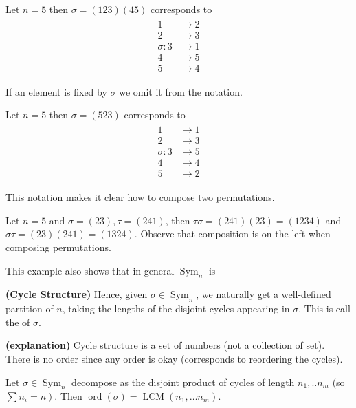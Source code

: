 \documentclass{article}
\newcommand{\bfs}[1]{\textbf{({#1}) }}
\newcommand{\ord}{\operatorname{ord}}
\newcommand{\Sym}{\operatorname{Sym}}
\newcommand{\LCM}{\operatorname{LCM}}
\begin{document}
\begin{exma}
Let $n=5$ then $\sigma=(123)(45)$ corresponds to
\begin{align*}
\begin{aligned}
1 & \longrightarrow 2 \\
2 & \longrightarrow 3 \\
\sigma: 3 & \longrightarrow 1 \\
4 & \longrightarrow 5 \\
5 & \longrightarrow 4
\end{aligned}
\end{align*}
\end{exma} 
If an element is fixed by $\sigma$ we omit it from the notation.
\begin{exma}
Let $n=5$ then $\sigma=(523)$ corresponds to
\begin{align*}
\begin{aligned}
1 & \longrightarrow 1 \\
2 & \longrightarrow 3 \\
\sigma: 3 & \longrightarrow 5 \\
4 & \longrightarrow 4 \\
5 & \longrightarrow 2
\end{aligned}
\end{align*}
\end{exma}
This notation makes it clear how to compose two permutations. 
\begin{exma}
Let $n=5$ and $\sigma=(23), \tau=(241)$, then $\tau \sigma=(241)(23)=(1234)$ and $\sigma \tau=(23)(241)=(1324) .$ Observe
that composition is on the left when composing permutations.
\end{exma} 
\begin{rema}
This example also shows that in general $\Sym_{n}$ is 
\end{rema}
\begin{defa}{\bfs{Cycle Structure}}
Hence, given $\sigma \in \Sym_{n}$, we naturally get a well-defined partition of $n$, taking the lengths of the disjoint cycles appearing in $\sigma$. This is call the  of $\sigma$.
\end{defa}
\begin{rema}{\bfs{explanation}}
Cycle structure is a set of numbers (not a collection of set). There is no order since any order is okay (corresponds to reordering the cycles).
\end{rema}
\begin{lema}
Let $\sigma \in \Sym_{n}$ decompose as the disjoint product of cycles of length $n_{1}, . . n_{m}$ (so $\left.\sum n_{i}=n\right) .$ Then $\ord(\sigma)=\LCM\left(n_{1}, \ldots n_{m}\right)$.
\end{lema} 
\end{document}
